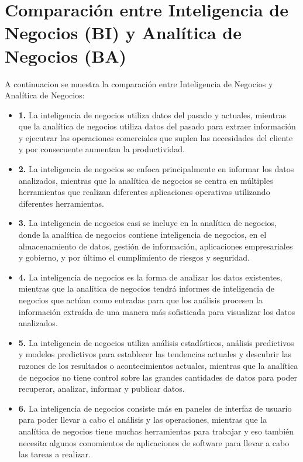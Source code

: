 \documentclass[preprint,12pt]{elsarticle}
\begin{document}

\section{Comparación entre Inteligencia de Negocios (BI) y Analítica de Negocios (BA)}
A continuacion se muestra la comparación entre Inteligencia de Negocios y Analítica de Negocios:
	
	\begin{itemize}

	\item{\textbf{1.}} La inteligencia de negocios utiliza datos del pasado y actuales, mientras que la analítica de negocios utiliza 			datos del pasado para extraer información y ejecutrar las operaciones comerciales que suplen las necesidades del cliente y por 		consecuente aumentan la productividad.
	\item{\textbf{2.}} La inteligencia de negocios se enfoca principalmente en informar los datos analizados, mientras que la analítica 	de negocios se centra en múltiples herramientas que realizan diferentes aplicaciones operativas utilizando diferentes 				herramientas.
	\item{\textbf{3.}} La inteligencia de negocios casi se incluye en la analítica de negocios, donde la analítica de negocios contiene 		inteligencia de negocios, en el almacenamiento de datos, gestión de información, aplicaciones empresariales y gobierno, y por 			último el cumplimiento de riesgos y seguridad.
	\item{\textbf{4.}} La inteligencia de negocios es la forma de analizar los datos existentes, mientras que la analítica de negocios 		tendrá informes de inteligencia de negocios que actúan como entradas para que los análisis procesen la información extraída de 		una manera más sofisticada para visualizar los datos analizados.
	\item{\textbf{5.}} La inteligencia de negocios utiliza análisis estadísticos, análisis predictivos y modelos predictivos para 				establecer las tendencias actuales y descubrir las razones de los resultados o acontecimientos actuales, mientras que la 			analítica de negocios no tiene control sobre las grandes cantidades de datos para poder recuperar, analizar, informar y publicar 		datos.
	\item{\textbf{6.}} La inteligencia de negocios consiste más en paneles de interfaz de usuario para poder llevar a cabo el análisis 		y las operaciones, mientras que la analítica de negocios tiene muchas herramientas para trabajar y eso también necesita algunos 		conomientos de aplicaciones de software para llevar a cabo las tareas a realizar.

\end{itemize}
\end{document}

